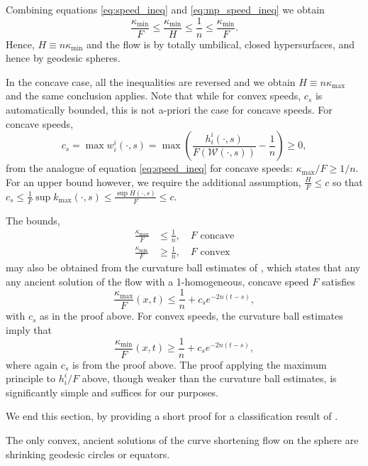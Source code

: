 \documentclass{amsart}
\begin{document}
{Combining equations \eqref{eq:speed_ineq} and \eqref{eq:mp_speed_ineq} we obtain
\[
\frac{\kappa_{\min}}{F} \leq \frac{\kappa_{\min}}{H} \leq \frac{1}{n} \leq \frac{\kappa_{\min}}{F}.
\]
Hence, $H\equiv n \kappa_{\min}$ and the flow is by totally umbilical, closed hypersurfaces, and hence by geodesic spheres.

In the concave case, all the inequalities are reversed and we obtain $H \equiv n \kappa_{\max}$ and the same conclusion applies. Note that while for convex speeds, $c_s$ is automatically bounded, this is not a-priori the case for concave speeds. For concave speeds,
\[
c_s = \max w^i_i(\cdot, s) = \max \left(\frac{h^i_i(\cdot, s)}{F(\mathcal{W}(\cdot, s))} - \frac{1}{n}\right) \geq 0,
\]
from the analogue of equation \eqref{eq:speed_ineq} for concave speeds: \(\kappa_{\max}/F \geq 1/n\). For an upper bound however, we require the additional assumption, \(\tfrac{H}{F} \leq c\) so that \(c_s \leq \tfrac{1}{F} \sup k_{\max}(\cdot, s) \leq \tfrac{\sup H(\cdot, s)}{F} \leq c\).
}
\begin{rem}
The bounds, 
\[
\begin{split}
\frac{\kappa_{\max}}{F} &\leq \frac{1}{n}, \quad \text{$F$ concave} \\
\frac{\kappa_{\min}}{F} &\geq \frac{1}{n}, \quad \text{$F$ convex}
\end{split}
\]
may also be obtained from the curvature ball estimates of \cite[Theorem 1.1]{AndrewsHanLiWei:/2015}, which states that any any ancient solution of the flow with a 1-homogeneous, concave speed $F$ satisfies
\[
\frac{\kappa_{\max}}{F}(x,t) \leq \frac{1}{n}+c_se^{-2n(t-s)},
\]
with \(c_s\) as in the proof above. For convex speeds, the curvature ball estimates imply that
\[
\frac{\kappa_{\min}}{F}(x,t)\geq \frac{1}{n}+c_se^{-2n(t-s)},
\]
where again \(c_s\) is from the proof above. The proof applying the maximum principle to \(h^i_i/F\) above, though weaker than the curvature ball estimates, is significantly simple and suffices for our purposes.
\end{rem}
We end this section, by providing a short proof for a classification result of \cite{BryanLouie:04/2016}.
\begin{thm}\cite{BryanLouie:04/2016}
The only convex, ancient solutions of the curve shortening flow on the sphere are shrinking geodesic circles or equators.
\end{thm}
\end{document}
